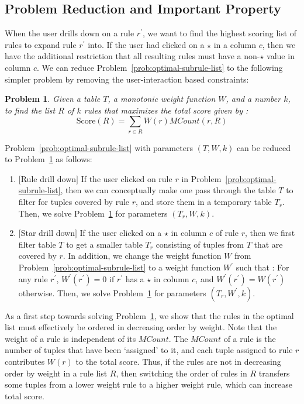 \documentclass[10pt,journal,compsoc]{IEEEtran}
\newcounter{prob}
\newtheorem{problem}[prob]{Problem}
\begin{document}
\subsection{Problem Reduction and Important Property} \label{sec:reduction}
When the user drills down on a rule $r^{\prime}$, we want to find the highest scoring list of rules to expand rule $r^{\prime}$ into. If the user had clicked on a $\star$ in a column $c$, then we have the additional restriction that all resulting rules must have a non-$\star$ value in column $c$. We can reduce Problem~\ref{prob:optimal-subrule-list} to the following simpler problem by removing the user-interaction based constraints: 

\begin{problem}\label{prob:optimal-rule-list}
Given a table $T$, a monotonic weight function $W$, and a number $k$, to find the list $R$ of $k$ rules that maximizes the total score given by :
$$\text{Score}(R) = \sum_{r \in R}W(r)MCount(r,R)$$
\end{problem}

\noindent Problem~\ref{prob:optimal-subrule-list} with parameters $(T, W, k)$ can be reduced to Problem~\ref{prob:optimal-rule-list} as follows:
\begin{enumerate}
\item $[$Rule drill down$]$ If the user clicked on rule $r$ in Problem~\ref{prob:optimal-subrule-list}, then we can conceptually make one pass through the table $T$ to filter for tuples covered by rule $r$, and store them in a temporary table $T_r$. Then, we solve Problem~\ref{prob:optimal-rule-list} for parameters $(T_r, W, k)$.
\item $[$Star drill down$]$ If the user clicked on a $\star$ in column $c$ of rule $r$, then we first filter table $T$ to get a smaller table $T_r$ consisting of tuples from $T$ that are covered by $r$. In addition, we change the weight function $W$ from Problem~\ref{prob:optimal-subrule-list} to a weight function $W^{\prime}$ such that : For any rule $r^{\prime}$, $W^{\prime}(r^{\prime}) = 0$ if $r^{\prime}$ has a $\star$ in column $c$, and $W^{\prime}(r^{\prime}) = W(r^{\prime})$ otherwise. Then, we solve Problem~\ref{prob:optimal-rule-list} for parameters $(T_r, W^{\prime}, k)$.
\end{enumerate}

As a first step towards solving Problem~\ref{prob:optimal-rule-list}, we show that the rules in the optimal list must effectively be ordered in decreasing order by weight. Note that the weight of a rule is independent of its $MCount$. The $MCount$ of a rule is the number of tuples that have been `assigned' to it, and each tuple assigned to rule $r$ contributes $W(r)$ to the total score. Thus, if the rules are not in decreasing order by weight in a rule list $R$, then switching the order of rules in $R$ transfers some tuples from a lower weight rule to a higher weight rule, which can increase total score.
\end{document}
